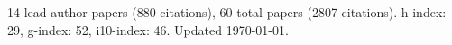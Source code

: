 14 lead author papers (880 citations),
60 total papers (2807 citations).\newline
h-index: 29, g-index: 52, i10-index: 46. Updated \today.